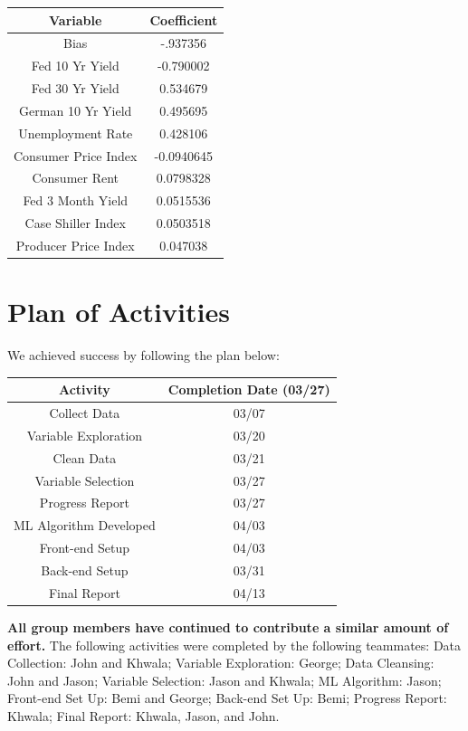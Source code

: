 \documentclass[sigconf,nonacm,11pt]{acmart}
\begin{document}
\begin{center}
    \begin{tabular}{||c|c||}
    \hline
    Variable & Coefficient\\
    \hline\hline
    Bias & -.937356\\
    Fed 10 Yr Yield & -0.790002\\
    Fed 30 Yr Yield & 0.534679\\
    German 10 Yr Yield & 0.495695\\
    Unemployment Rate & 0.428106\\
    Consumer Price Index & -0.0940645\\
    Consumer Rent & 0.0798328\\
    Fed 3 Month Yield & 0.0515536\\
    Case Shiller Index & 0.0503518\\
    Producer Price Index & 0.047038\\
    \hline
    \end{tabular}
\end{center}


\section{Plan of Activities}

We achieved success by following the plan below:\vspace{0.07em}
\begin{center}
    \begin{tabular}{||c|c||}
    \hline
    Activity & Completion Date (03/27)\\
    \hline\hline
    Collect Data & 03/07\\
    Variable Exploration & 03/20\\
    Clean Data & 03/21\\
    Variable Selection & 03/27\\
    Progress Report & 03/27\\
    ML Algorithm Developed & 04/03\\
    Front-end Setup & 04/03\\
    Back-end Setup & 03/31\\
    Final Report & 04/13\\
    \hline
    \end{tabular}
\end{center}

\textbf{All group members have continued to contribute a similar amount of effort.} The following activities were completed by the following teammates: Data Collection: John and Khwala; Variable Exploration: George; Data Cleansing: John and Jason; Variable Selection: Jason and Khwala; ML Algorithm: Jason; Front-end Set Up: Bemi and George; Back-end Set Up: Bemi; Progress Report: Khwala; Final Report: Khwala, Jason, and John. 
\end{document}
